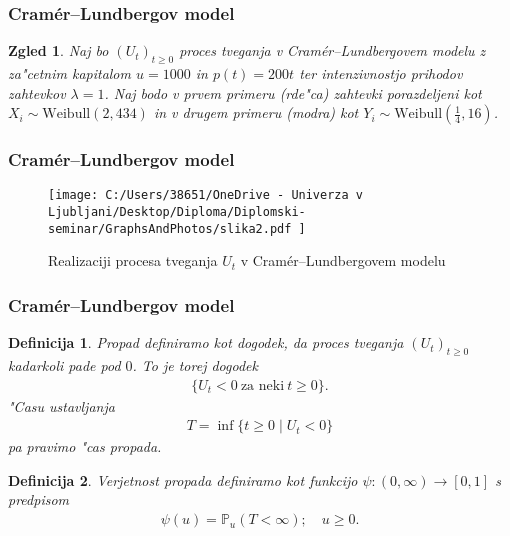 \documentclass[handout]{beamer} %
\theoremstyle{plain}
\newtheorem{definicija}{Definicija}
\newtheorem{zgled}{Zgled}
\newcommand{\Prob}{\mathbb{P}}
\begin{document}
\begin{frame}
  \frametitle{Cramér--Lundbergov model}
  \begin{zgled}
    Naj bo $(U_t)_{t\geq0}$ proces tveganja v Cramér--Lundbergovem modelu z za"cetnim kapitalom
    $u = 1000$ in $p(t) = 200t$ ter intenzivnostjo prihodov zahtevkov $\lambda=1$. %
    Naj bodo v prvem primeru (rde"ca) 
    zahtevki porazdeljeni kot $X_i \sim \text{Weibull}(2, 434)$ in v drugem primeru (modra) kot
    $Y_i \sim \text{Weibull}(\tfrac{1}{4}, 16)$.
  \end{zgled}
\end{frame}

\begin{frame}
  \frametitle{Cramér--Lundbergov model}
  \begin{figure}[H]
    \centering
    \texttt{[image: 
        C:/Users/38651/OneDrive - Univerza v Ljubljani/Desktop/Diploma/Diplomski-seminar/GraphsAndPhotos/slika2.pdf
        ]}
    \label{fig:slika2}
    \caption{Realizaciji procesa tveganja $U_t$ v Cramér--Lundbergovem modelu}
\end{figure}
\end{frame}

\begin{frame}
  \frametitle{Cramér--Lundbergov model}
  \begin{definicija}
    \textit{Propad} definiramo kot dogodek, da proces tveganja $(U_t)_{t\geq0}$ kadarkoli pade pod $0$. 
    To je torej dogodek 
    \begin{align*}
        \bigl\{U_t<0 \ \text{za neki} \ t\geq 0\bigr\}.
    \end{align*}
    "Casu ustavljanja
    \begin{align*}
        T = \inf\{t\geq0 \mid U_t < 0\}
    \end{align*}
    pa pravimo \textit{"cas propada}.
  \end{definicija}
  \pause
  \begin{definicija}
      \textit{Verjetnost propada} definiramo kot funkcijo $\psi: (0,\infty) \to [0,1]$ 
      s predpisom
      \begin{align*}
          \psi(u) = \Prob_u(T<\infty); \quad u\geq0.
      \end{align*}
  \end{definicija}
\end{frame}
\end{document}
